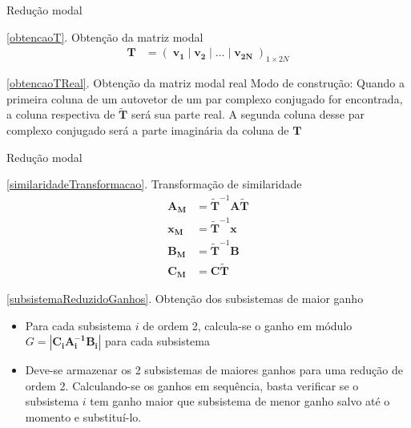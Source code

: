 \documentclass[10pt]{beamer}
\begin{document}
\begin{frame}[fragile]{Redução modal}
\begin{block}{\ref{obtencaoT}. Obtenção da matriz modal}
	\begin{align}
	\mathbf{T} &= \left(\;\mathbf{v_1}\;|\;\mathbf{v_2}\;|\;\ldots\;|\;\mathbf{v_{2N}}\;\right)_{1\times 2N}
\end{align}
\end{block}

\begin{block}{\ref{obtencaoTReal}. Obtenção da matriz modal real}
Modo de construção: Quando a primeira coluna de um autovetor de um par complexo conjugado for encontrada, a coluna respectiva de $\tilde{\mathbf{T}}$ será sua parte real. A segunda coluna desse par complexo conjugado será a parte imaginária da coluna de $\mathbf{T}$
\end{block}

\end{frame}


\begin{frame}[fragile]{Redução modal}
\begin{block}{\ref{similaridadeTransformacao}. Transformação de similaridade}
\begin{align}
	\mathbf{A_M} &= \tilde{\mathbf{T}}^{-1}\mathbf{A}\tilde{\mathbf{T}}\\
	\mathbf{x_M} &=\tilde{\mathbf{T}}^{-1}\mathbf{x}	\\
	\mathbf{B_M} &= \tilde{\mathbf{T}}^{-1}\mathbf{B}\\
	\mathbf{C_M} &=\mathbf{C}\tilde{\mathbf{T}}
\end{align}	
\end{block}

\begin{block}{\ref{subsistemaReduzidoGanhos}. Obtenção dos subsistemas de maior ganho}
\begin{itemize}
	\item Para cada subsistema $i$ de ordem 2, calcula-se o ganho em módulo $G = |\mathbf{C_i}\mathbf{A_i^{-1}}\mathbf{B_i}|$ para cada subsistema 
	\item Deve-se armazenar os 2 subsistemas de maiores ganhos para uma redução de ordem 2. Calculando-se os ganhos em sequência, basta verificar se o subsistema $i$ tem ganho maior que subsistema de menor ganho salvo até o momento e substituí-lo. 
\end{itemize}

\end{block}
\end{frame}
\end{document}

